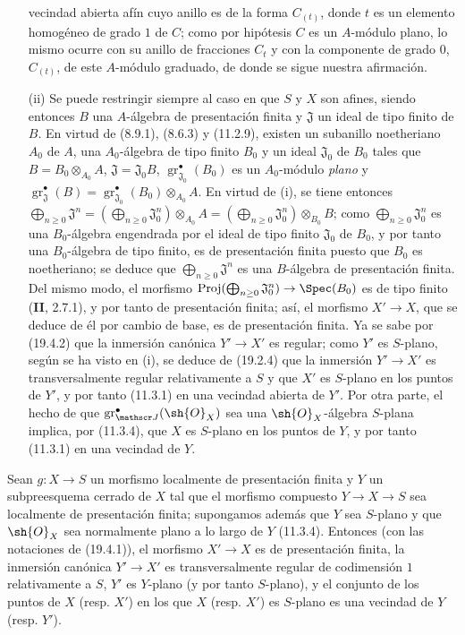 \begin{enumerate}
vecindad abierta afín cuyo anillo es de la forma $C_{(t)}$, donde $t$ es un elemento homogéneo de grado $1$ de $C$; como por hipótesis $C$ es un $A$-módulo plano, lo mismo ocurre con su anillo de fracciones $C_t$ y con la componente de grado $0$, $C_{(t)}$, de este $A$-módulo graduado, de donde se sigue nuestra afirmación.
  \item[(ii)] Se puede restringir siempre al caso en que $S$ y $X$ son afines, siendo entonces $B$ una $A$-álgebra de presentación finita y $\mathfrak J$ un ideal de tipo finito de $B$. En virtud de (8.9.1), (8.6.3) y (11.2.9), existen un subanillo noetheriano $A_0$ de $A$, una $A_0$-álgebra de tipo finito $B_0$ y un ideal $\mathfrak J_0$ de $B_0$ tales que $B=B_0\otimes_{A_0}A$, $\mathfrak J=\mathfrak J_0B$, $\operatorname{gr}_{\mathfrak J_0}^\bullet(B_0)$ es un $A_0$-módulo \emph{plano} y $\operatorname{gr}_{\mathfrak J}^\bullet(B)=\operatorname{gr}_{\mathfrak J_0}^\bullet(B_0)\otimes_{A_0}A$. En virtud de (i), se tiene entonces $\bigoplus_{n\geq0}\mathfrak J^n=(\bigoplus_{n\geq0}\mathfrak J_0^n)\otimes_{A_0}A=(\bigoplus_{n\geq0}\mathfrak J_0^n)\otimes_{B_0}B$; como $\bigoplus_{n\geq0}\mathfrak J_0^n$ es una $B_0$-álgebra engendrada por el ideal de tipo finito $\mathfrak J_0$ de $B_0$, y por tanto una $B_0$-álgebra de tipo finito, es de presentación finita puesto que $B_0$ es noetheriano; se deduce que $\bigoplus_{n\geq0}\mathfrak J^n$ es una $B$-álgebra de presentación finita. Del mismo modo, el morfismo $\operatorname{Proj}(\bigoplus_{n\geq0}\mathfrak J_0^n)\to\Spec(B_0)$ es de tipo finito (\textbf{II}, 2.7.1), y por tanto de presentación finita; así, el morfismo $X'\to X$, que se deduce de él por cambio de base, es de presentación finita. Ya se sabe por (19.4.2) que la inmersión canónica $Y'\to X'$ es regular; como $Y'$ es $S$-plano, según se ha visto en (i), se deduce de (19.2.4) que la inmersión $Y'\to X'$ es transversalmente regular relativamente a $S$ y que $X'$ es $S$-plano en los puntos de $Y'$, y por tanto (11.3.1) en una vecindad abierta de $Y'$. Por otra parte, el hecho de que $\operatorname{gr}_{\mathscr J}^\bullet(\sh{O}_X)$ sea una $\sh{O}_X$-álgebra $S$-plana implica, por (11.3.4), que $X$ es $S$-plano en los puntos de $Y$, y por tanto (11.3.1) en una vecindad de $Y$.
\end{enumerate}

\begin{corollary}[19.4.7]
\label{IV.19.4.7}
Sean $g:X\to S$ un morfismo localmente de presentación finita y $Y$ un subpreesquema cerrado de $X$ tal que el morfismo compuesto $Y\to X\to S$ sea localmente de presentación finita; supongamos además que $Y$ sea $S$-plano y que $\sh{O}_X$ sea normalmente plano a lo largo de $Y$ \textup{(11.3.4)}. Entonces \textup{(con las notaciones de (19.4.1))}, el morfismo $X'\to X$ es de presentación finita, la inmersión canónica $Y'\to X'$ es transversalmente regular de codimensión $1$ relativamente a $S$, $Y'$ es $Y$-plano (y por tanto $S$-plano), y el conjunto de los puntos de $X$ \textup{(resp. $X'$)} en los que $X$ \textup{(resp. $X'$)} es $S$-plano es una vecindad de $Y$ \textup{(resp. $Y'$)}.
\end{corollary}

